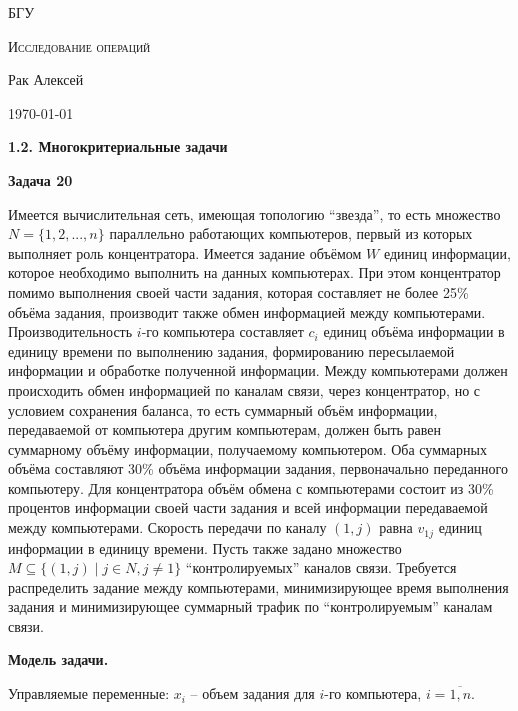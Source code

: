 \documentclass[a4paper,14pt]{extreport}
\begin{document}
%
\begin{titlepage}
		\centering
		{\scshape\Large БГУ \par}
        \vfill
        {\scshape\LARGE Исследование операций\par}
        \vspace{2cm}
        {\LARGE Рак Алексей\par}
        \vfill
        {\large \today}
\end{titlepage}
\setcounter{page}{2}

\begin{center}
	\textbf{1.2. Многокритериальные задачи}
\end{center}

\textbf{Задача 20}

Имеется вычислительная сеть, имеющая топологию “звезда”, то есть множество $N=\{1, 2, ..., n\}$ параллельно работающих компьютеров, первый из которых выполняет роль концентратора. Имеется задание объёмом $W$ единиц информации, которое необходимо выполнить на данных компьютерах. При этом концентратор помимо выполнения своей части задания, которая составляет не более 25\% объёма задания, производит также обмен информацией между компьютерами. Производительность $i$-го компьютера составляет $c_i$ единиц объёма информации в единицу времени по выполнению задания, формированию пересылаемой информации и обработке полученной информации. Между компьютерами должен происходить обмен информацией по каналам связи, через концентратор, но с условием сохранения баланса, то есть суммарный объём информации, передаваемой от компьютера другим компьютерам, должен быть равен суммарному объёму информации, получаемому компьютером. Оба суммарных объёма составляют 30\% объёма информации задания, первоначально переданного компьютеру. Для концентратора объём обмена с компьютерами состоит из 30\% процентов информации своей части задания и всей информации передаваемой между компьютерами. Скорость передачи по каналу $(1, j)$ равна $v_{1j}$ единиц информации в единицу времени. Пусть также задано множество $M \subseteq \{(1,j) \mid j \in N, j \ne 1\}$ “контролируемых” каналов связи. Требуется распределить задание между компьютерами, минимизирующее время выполнения задания и минимизирующее суммарный трафик по “контролируемым” каналам связи.
\newline

\textbf{Модель задачи.} 

Управляемые переменные: $x_i$ -- объем задания для $i$-го компьютера, $i = \overline{1, n}$.
\end{document}
